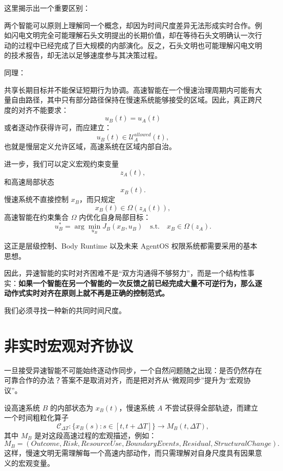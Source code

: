 这里揭示出一个重要区别：

\begin{statementbox}
\centering
{}
\end{statementbox}

两个智能可以原则上理解同一个概念，却因为时间尺度差异无法形成实时合作。例如闪电文明完全可能理解石头文明提出的长期价值，却在等待石头文明确认一次行动的过程中已经完成了巨大规模的内部演化。反之，石头文明也可能理解闪电文明的技术报告，却无法以足够速度参与其决策过程。

同理：
\begin{statementbox}
\centering
{}
\end{statementbox}
共享长期目标并不能保证短期行为协调。高速智能在一个慢速治理周期内可能有大量自由路径，其中只有部分路径保持在慢速系统能够接受的区域。因此，真正跨尺度的对齐不能要求：
\[
u_B(t)=u_A(t)
\]
或者逐动作获得许可，而应建立：
\[
u_B(t)\in\mathcal U_A^{allowed}(t),
\]
也就是慢层定义允许区域，高速系统在区域内部自治。

进一步，我们可以定义宏观约束变量
\[
z_A(t),
\]
和高速局部状态
\[
x_B(t).
\]
慢速系统不直接控制 $x_B$，而只规定
\[
x_B(t)\in\Omega(z_A(t)),
\]
高速智能在约束集合 $\Omega$ 内优化自身局部目标：
\[
u_B^*
=
\arg\min_{u_B}
J_B(x_B,u_B)
\quad
\text{s.t.}
\quad
x_B\in\Omega(z_A).
\]

这正是层级控制、Body Runtime 以及未来 AgentOS 权限系统都需要采用的基本思想。

因此，异速智能的实时对齐困难不是“双方沟通得不够努力”，而是一个结构性事实：\textbf{如果一个智能在另一个智能的一次反馈之前已经完成大量不可逆行为，那么逐动作式实时对齐在原则上就不再是正确的控制范式。}

我们必须寻找一种新的共同时间尺度。


\section{非实时宏观对齐协议}

一旦接受异速智能不可能始终逐动作同步，一个自然问题随之出现：是否仍然存在可靠合作的办法？答案不是取消对齐，而是把对齐从“微观同步”提升为“宏观协议”。

设高速系统 $B$ 的内部状态为 $x_B(t)$，慢速系统 $A$ 不尝试获得全部轨迹，而建立一个时间粗粒化算子
\[
\mathcal C_{\Delta T}:
\{x_B(s):s\in[t,t+\Delta T]\}
\rightarrow
M_B(t,\Delta T),
\]
其中 $M_B$ 是对这段高速过程的宏观描述，例如：
\[
M_B=
(
Outcome,
Risk,
ResourceUse,
BoundaryEvents,
Residual,
StructuralChange
).
\]
这样，慢速文明无需理解每一个高速内部动作，而只需理解对自身尺度具有因果意义的宏观变量。

